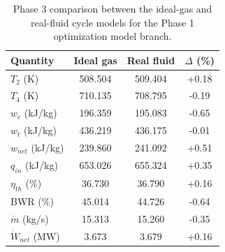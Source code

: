 \begin{table}[htbp]
    \centering
    \caption{Phase 3 comparison between the ideal-gas and real-fluid cycle models for the Phase 1 optimization model branch.}
    \label{tab:phase3_comparison_phase1_optimization}
    \begin{tabular}{lccc}
        \hline
        Quantity & Ideal gas & Real fluid & $\Delta$ (\%) \\
        \hline
        $T_2$ (K) & 508.504 & 509.404 & +0.18 \\
        $T_4$ (K) & 710.135 & 708.795 & -0.19 \\
        $w_c$ (kJ/kg) & 196.359 & 195.083 & -0.65 \\
        $w_t$ (kJ/kg) & 436.219 & 436.175 & -0.01 \\
        $w_{net}$ (kJ/kg) & 239.860 & 241.092 & +0.51 \\
        $q_{in}$ (kJ/kg) & 653.026 & 655.324 & +0.35 \\
        $\eta_{th}$ (\%) & 36.730 & 36.790 & +0.16 \\
        BWR (\%) & 45.014 & 44.726 & -0.64 \\
        $\dot{m}$ (kg/s) & 15.313 & 15.260 & -0.35 \\
        $\dot{W}_{net}$ (MW) & 3.673 & 3.679 & +0.16 \\
        \hline
    \end{tabular}
\end{table}